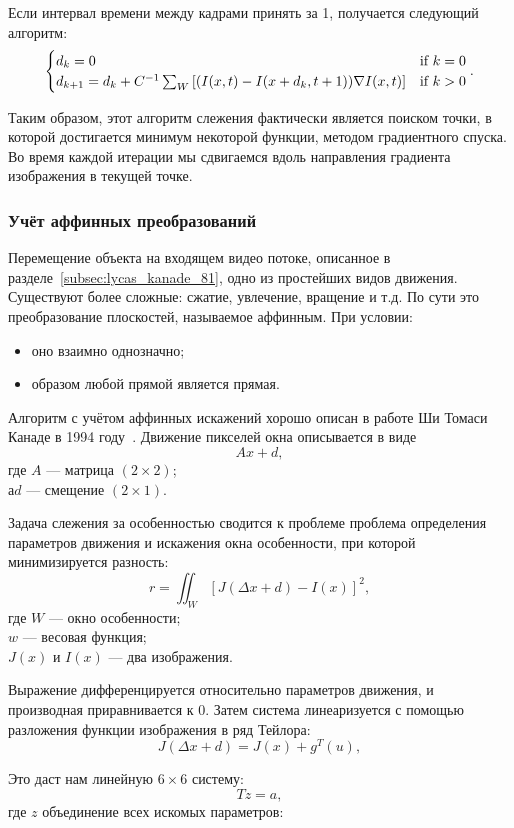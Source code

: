 Если интервал времени между кадрами принять за 1, получается следующий алгоритм:
\begin{equation}
\numberwithin{equation}{section}
\label{eq:alg_pyr}
\begin{cases} d_k = 0 &\mbox{if } k = 0 \\
d_{k+1}=d_k + C^{-1} \sum_W \left[ (I(x,t) - I(x+d_k,t + 1)) \nabla I (x,t) \right] & \mbox{if } k > 0 \end{cases}.
\end{equation}

Таким образом, этот алгоритм слежения фактически является поиском точки, в которой достигается минимум некоторой функции, методом градиентного спуска. Во время каждой итерации мы сдвигаемся вдоль направления градиента изображения в текущей точке.
\subsubsection{Учёт аффинных преобразований}
Перемещение объекта на входящем видео потоке, описанное в разделе~\ref{subsec:lycas_kanade_81}, одно из простейших видов движения. Существуют более сложные: сжатие, увлечение, вращение и т.д. По сути это преобразование плоскостей, называемое аффинным. При условии:
\begin{itemize}
\item оно взаимно однозначно;
\item образом любой прямой является прямая.
\end{itemize}

Алгоритм с учётом аффинных искажений хорошо описан в работе Ши Томаси Канаде в 1994 году~\cite{shi_tom_lyk}. Движение пикселей окна описывается в виде $$Ax + d,$$
где $A$ — матрица $(2 \times 2)$;\\
$а d$ — смещение $(2 \times 1)$.

Задача слежения за особенностью сводится к проблеме проблема определения параметров движения и искажения окна особенности, при которой минимизируется разность:
$$r=\iint_W [J(\Delta x+d)-I(x)]^2,$$
где $W$ — окно особенности;\\
$w$ — весовая функция;\\
$J(x)$ и $I(x)$ — два изображения.

Выражение дифференцируется относительно параметров движения, и производная приравнивается к 0. Затем система линеаризуется с помощью разложения функции изображения в ряд Тейлора:
$$J(\Delta x+d)= J(x)+g^T(u),$$

Это даст нам линейную $6 \times 6$ систему:
$$Tz=a,$$
где $z$ объединение всех искомых параметров:

